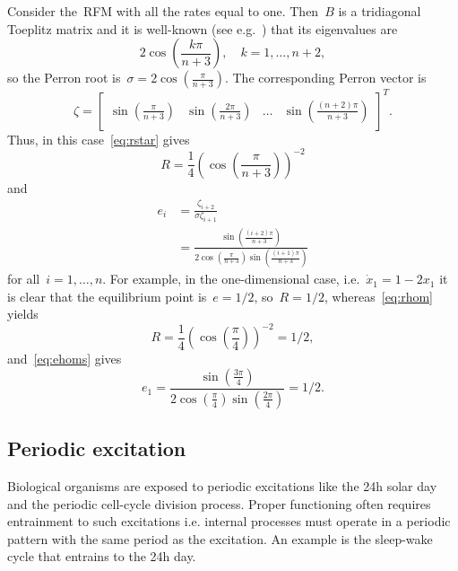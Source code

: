 Consider the~\ac{RFM} with all the rates equal to one. 
Then~$B$ is a tridiagonal Toeplitz matrix and it is well-known (see e.g.~\cite{spectral_toeplitz_tridiagonal}) that its eigenvalues are
%
\begin{equation}
	2\cos(\frac{k \pi}{n+3}) , \quad k=1,\dots,n+2,
\end{equation}
%
so the Perron root is~$\sigma=2\cos(\frac{  \pi}{n+3})$. 
The corresponding Perron vector is  
% 
\begin{equation}
	\zeta=\begin{bmatrix}  
		\sin(\frac{\pi  }{n+3}) &
		\sin(\frac{ 2 \pi  }{n+3}) &\dots&
		\sin(\frac{(n+2)\pi  }{n+3}) 
	 \end{bmatrix}^T. 
\end{equation}
%
Thus, in this case~\eqref{eq:rstar} gives
%
\begin{equation}
	\label{eq:rhom}
		R=\frac{1}{4}(\cos(\frac{  \pi}{n+3}))^{-2}
\end{equation}
%
and 
%
\begin{subequations}
	\begin{align} \label{eq:ehoms}
		e_i&=\frac{  \zeta_{i+2} }{      \sigma     \zeta_{i+1} } \\
		&=\frac{  \sin(\frac{ (i+2) \pi  }{n+3}) }{    2\cos(\frac{  \pi}{n+3})    \sin(\frac{ (i+1) \pi  }{n+3}) } 
	\end{align}
\end{subequations}
%
for all~$i=1,\dots,n$. 
For example, in the one-dimensional case, i.e.~$\dot x_1=1-2x_1$ it is clear that the equilibrium point is~$e=1/2$, so~$R=1/2$, whereas~\eqref{eq:rhom} yields 
%
\begin{equation}
R=\frac{1}{4}(\cos(\frac{  \pi}{4}))^{-2} = 1/2,
\end{equation}
%
and~\eqref{eq:ehoms} gives
%
\begin{equation}
e_1 = \frac{  \sin(\frac{ 3 \pi  }{4}) }{    2\cos(\frac{  \pi}{4})    \sin(\frac{ 2 \pi  }4) }  = 1/2.
\end{equation}
%

\subsection{Periodic excitation}

Biological organisms are exposed to periodic excitations like the 24h solar day and the periodic cell-cycle division  process. 
Proper functioning often requires entrainment to such excitations i.e. internal processes  must operate in a periodic pattern with the same period as the excitation. 
An example is the sleep-wake cycle that entrains to the 24h day. 

